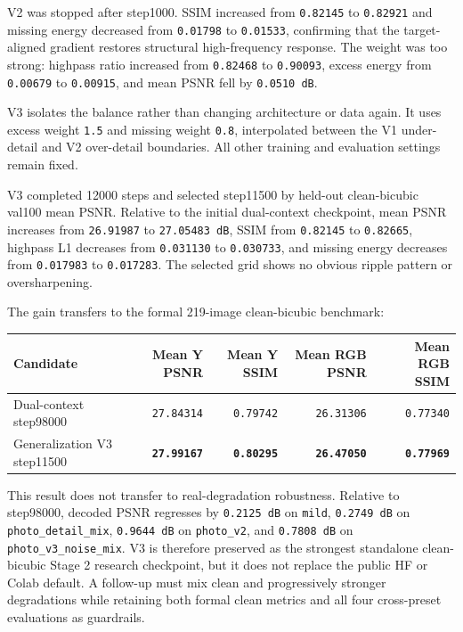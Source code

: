 \documentclass[
  10pt,
]{article}
\begin{document}
V2 was stopped after step1000. SSIM increased from \texttt{0.82145} to
\texttt{0.82921} and missing energy decreased from \texttt{0.01798} to
\texttt{0.01533}, confirming that the target-aligned gradient restores
structural high-frequency response. The weight was too strong: highpass
ratio increased from \texttt{0.82468} to \texttt{0.90093}, excess energy
from \texttt{0.00679} to \texttt{0.00915}, and mean PSNR fell by
\texttt{0.0510\ dB}.

V3 isolates the balance rather than changing architecture or data again.
It uses excess weight \texttt{1.5} and missing weight \texttt{0.8},
interpolated between the V1 under-detail and V2 over-detail boundaries.
All other training and evaluation settings remain fixed.

V3 completed 12000 steps and selected step11500 by held-out
clean-bicubic val100 mean PSNR. Relative to the initial dual-context
checkpoint, mean PSNR increases from \texttt{26.91987} to
\texttt{27.05483\ dB}, SSIM from \texttt{0.82145} to \texttt{0.82665},
highpass L1 decreases from \texttt{0.031130} to \texttt{0.030733}, and
missing energy decreases from \texttt{0.017983} to \texttt{0.017283}.
The selected grid shows no obvious ripple pattern or oversharpening.

The gain transfers to the formal 219-image clean-bicubic benchmark:

\begin{longtable}[]{@{}lrrrr@{}}
\toprule\noalign{}
Candidate & Mean Y PSNR & Mean Y SSIM & Mean RGB PSNR & Mean RGB SSIM \\
\midrule\noalign{}
\endhead
\bottomrule\noalign{}
\endlastfoot
Dual-context step98000 & \texttt{27.84314} & \texttt{0.79742} &
\texttt{26.31306} & \texttt{0.77340} \\
Generalization V3 step11500 & \textbf{\texttt{27.99167}} &
\textbf{\texttt{0.80295}} & \textbf{\texttt{26.47050}} &
\textbf{\texttt{0.77969}} \\
\end{longtable}

This result does not transfer to real-degradation robustness. Relative
to step98000, decoded PSNR regresses by \texttt{0.2125\ dB} on
\texttt{mild}, \texttt{0.2749\ dB} on \texttt{photo\_detail\_mix},
\texttt{0.9644\ dB} on \texttt{photo\_v2}, and \texttt{0.7808\ dB} on
\texttt{photo\_v3\_noise\_mix}. V3 is therefore preserved as the
strongest standalone clean-bicubic Stage 2 research checkpoint, but it
does not replace the public HF or Colab default. A follow-up must mix
clean and progressively stronger degradations while retaining both
formal clean metrics and all four cross-preset evaluations as
guardrails.
\end{document}
